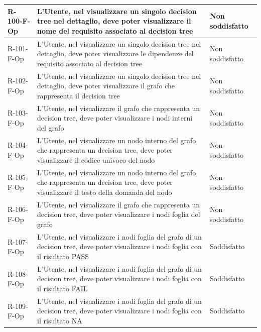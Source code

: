 \documentclass[a4paper,12pt]{article}
\begin{document}
{{\begin{longtable}{|l|p{}|p{}|}
                R-100-F-Op       & L'Utente, nel visualizzare un singolo decision tree nel dettaglio, deve poter visualizzare il nome del requisito associato al decision tree                                                 & Non soddisfatto \\ \hline
                R-101-F-Op       & L'Utente, nel visualizzare un singolo decision tree nel dettaglio, deve poter visualizzare le dipendenze del requisito associato al decision tree                                           & Non soddisfatto \\ \hline
                R-102-F-Op       & L'Utente, nel visualizzare un singolo decision tree nel dettaglio, deve poter visualizzare il grafo che rappresenta il decision tree                                                        & Non soddisfatto \\ \hline
                R-103-F-Op       & L'Utente, nel visualizzare il grafo che rappresenta un decision tree, deve poter visualizzare i nodi interni del grafo                                                                      & Non soddisfatto \\ \hline
                R-104-F-Op       & L'Utente, nel visualizzare un nodo interno del grafo che rappresenta un decision tree, deve poter visualizzare il codice univoco del nodo                                                   & Non soddisfatto \\ \hline
                R-105-F-Op       & L'Utente, nel visualizzare un nodo interno del grafo che rappresenta un decision tree, deve poter visualizzare il testo della domanda del nodo                                              & Non soddisfatto \\ \hline
                R-106-F-Op       & L'Utente, nel visualizzare il grafo che rappresenta un decision tree, deve poter visualizzare i nodi foglia del grafo                                                                       & Non soddisfatto \\ \hline
                R-107-F-Op       & L'Utente, nel visualizzare i nodi foglia del grafo di un decision tree, deve poter visualizzare i nodi foglia con il risultato PASS & Soddisfatto \\ \hline
                R-108-F-Op       & L'Utente, nel visualizzare i nodi foglia del grafo di un decision tree, deve poter visualizzare i nodi foglia con il risultato FAIL & Soddisfatto \\ \hline
                R-109-F-Op       & L'Utente, nel visualizzare i nodi foglia del grafo di un decision tree, deve poter visualizzare i nodi foglia con il risultato NA & Soddisfatto \\ \hline

\end{longtable}}}
\end{document}
